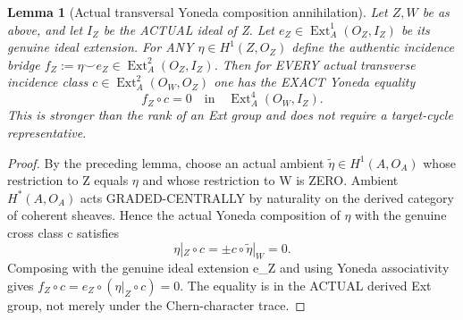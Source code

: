 \documentclass[11pt,a4paper]{article}
\newtheorem{lemma}[theorem]{Lemma}
\begin{document}
\begin{lemma}[Actual transversal Yoneda composition annihilation]
Let \(Z,W\) be as
above, and let
\(I_Z\) be the ACTUAL
ideal of Z.
Let
\(e_Z\in
\operatorname{Ext}^1_A
 (O_Z,I_Z)\)
be its genuine
ideal extension.
For ANY
\(\eta\in H^1(Z,O_Z)\)
define the authentic
incidence bridge
\(
 f_Z:=\eta\smile e_Z
\in\operatorname{Ext}^2_A
(O_Z,I_Z)
\).
Then for EVERY
actual transverse
incidence class
\(
 c\in\operatorname{Ext}^2_A
(O_W,O_Z)
\)
one has the
EXACT Yoneda equality
\[
 \boxed{
            f_Z\circ c=0
     \quad\text{in}\quad
     \operatorname{Ext}^4_A(O_W,I_Z).}
                                                               \tag{10.4}
\]
This is stronger
than the rank of
an Ext group and
does not require
a target-cycle
representative.
\end{lemma}
\begin{proof}
By the preceding
lemma, choose
an actual ambient
\(
\widetilde\eta\in
H^1(A,O_A)
\)
whose restriction
to Z equals
\(\eta\) and
whose restriction
to W is ZERO.
Ambient
\(H^*(A,O_A)\)
acts GRADED-CENTRALLY
by naturality on the
derived category
of coherent sheaves.
Hence the actual
Yoneda composition
of \(\eta\)
with the genuine
cross class c
satisfies
\[
     \eta|_Z\circ c
       =\pm c\circ
                   \widetilde\eta|_W
       =0.
\]
Composing with
the genuine ideal
extension e_Z
and using Yoneda
associativity gives
\(
 f_Z\circ c
 =e_Z\circ
    (\eta|_Z\circ c)
 =0
\).
The equality is
in the ACTUAL
derived Ext group,
not merely under
the Chern-character
trace.
\end{proof}
\end{document}
